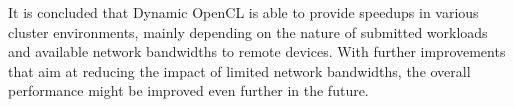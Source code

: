 It is concluded that Dynamic OpenCL is able to provide speedups in various cluster environments, mainly depending on the nature of submitted workloads and available network bandwidths to remote devices. With further improvements that aim at reducing the impact of limited network bandwidths, the overall performance might be improved even further in the future.


